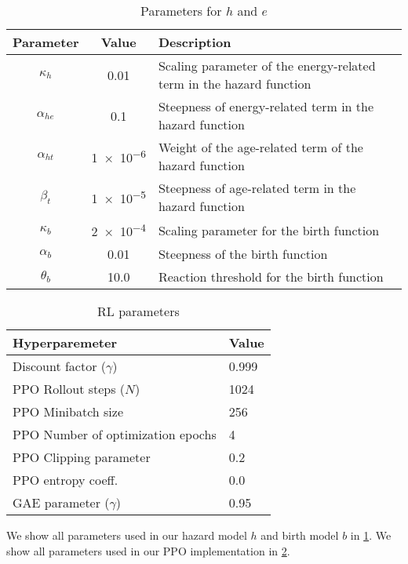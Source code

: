 \begin{table}[t]
  \centering
  \caption{Parameters for $h$ and $e$}\label{tab:bd-param}
  \begin{tabular}{ccl}
  \toprule
    Parameter & Value & Description \\
    \midrule
    $\kappa_{h}$ & 0.01 & Scaling parameter of the energy-related term in the hazard function \\
    $\alpha_{he}$ & 0.1 & Steepness of energy-related term in the hazard function \\
    $\alpha_{ht}$ & \num{1e-6} & Weight of the age-related term of the hazard function \\
    $\beta_{t}$ & \num{1e-5} & Steepness of age-related term in the hazard function \\
    $\kappa_{b}$ & \num{2e-4} & Scaling parameter for the birth function\\
    $\alpha_{b}$ & 0.01 & Steepness of the birth function \\
    $\theta_{b}$ & 10.0 & Reaction threshold for the birth function \\
    \bottomrule
  \end{tabular}
\end{table}

\begin{table}[t]
  \centering
  \caption{RL parameters}\label{tab:rl-param}
  \begin{tabular}{ll}
  \toprule
    Hyperparemeter & Value \\
    \midrule
    Discount factor ($\gamma$) & 0.999 \\
    PPO Rollout steps ($N$) & 1024 \\
    PPO Minibatch size & 256 \\
    PPO Number of optimization epochs & 4 \\
    PPO Clipping parameter & 0.2 \\
    PPO entropy coeff. & 0.0 \\
    GAE parameter ($\gamma$) & 0.95 \\
  \end{tabular}
\end{table}

We show all parameters used in our hazard model $h$ and birth model $b$ in \cref{tab:bd-param}.
We show all parameters used in our PPO implementation in \cref{tab:rl-param}.